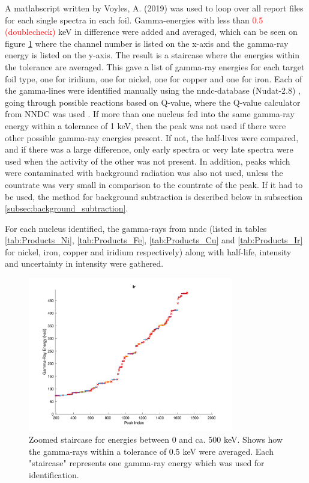 A matlabscript written by Voyles, A. (2019) was used to loop over all report files for each single spectra in each foil. Gamma-energies with less than \textcolor{red}{0.5 (doublecheck)}  keV in difference were added and averaged, which can be seen on figure \ref{fig:Ir_staircase_gammas} where the channel number is listed on the x-axis and the gamma-ray energy is listed on the y-axis. The result is a staircase where the energies within the tolerance are averaged. This gave a list of gamma-ray energies for each target foil type, one for iridium, one for nickel, one for copper and one for iron. Each of the gamma-lines were identified manually using the nndc-database (Nudat-2.8) \cite{VRAPCENJAKLidijaZERKIN2015}, going through possible reactions based on Q-value, where the Q-value calculator from NNDC was used \cite{PritychenkoB.SonzogniA.NNDC}. If more than one nucleus fed into the same gamma-ray energy within a tolerance of 1 keV, then the peak was not used if there were other possible gamma-ray energies present. If not, the half-lives were compared, and if there was a large difference, only early spectra or very late spectra were used when the activity of the other was not present. In addition, peaks which were contaminated with background radiation was also not used, unless the countrate was very small in comparison to the countrate of the peak. If it had to be used, the method for background subtraction is described below in subsection \ref{subsec:background_subtraction}. 

For each nucleus identified, the gamma-rays from nndc (listed in tables \ref{tab:Products_Ni}, \ref{tab:Products_Fe}, \ref{tab:Products_Cu} and \ref{tab:Products_Ir} for nickel, iron, copper and iridium respectively) along with half-life, intensity and uncertainty in intensity were gathered. 

\begin{figure}
    \centering
    \includegraphics[width=0.8\textwidth]{Analysis/Ir_staircase_zoomed.png}
    \caption{Zoomed staircase for energies between 0 and ca. 500 keV.  Shows how the gamma-rays within  a tolerance of 0.5 keV were averaged. Each "staircase" represents one gamma-ray energy which was used for identification. }
    \label{fig:Ir_staircase_gammas}
\end{figure}

